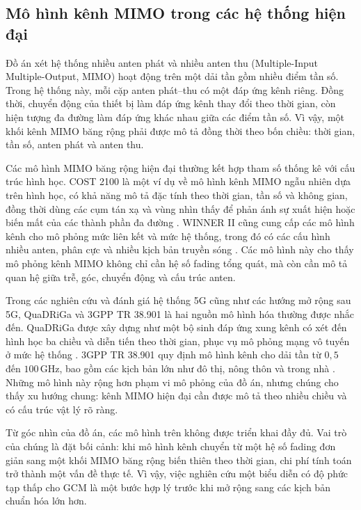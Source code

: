 \subsection{Mô hình kênh MIMO trong các hệ thống hiện đại}
\label{subsec:ch1_modern_mimo_channel_models}

Đồ án xét hệ thống nhiều anten phát và nhiều anten thu (Multiple-Input Multiple-Output, MIMO) hoạt động trên một dải tần gồm nhiều điểm tần số. Trong hệ thống này, mỗi cặp anten phát--thu có một đáp ứng kênh riêng. Đồng thời, chuyển động của thiết bị làm đáp ứng kênh thay đổi theo thời gian, còn hiện tượng đa đường làm đáp ứng khác nhau giữa các điểm tần số. Vì vậy, một khối kênh MIMO băng rộng phải được mô tả đồng thời theo bốn chiều: thời gian, tần số, anten phát và anten thu.

Các mô hình MIMO băng rộng hiện đại thường kết hợp tham số thống kê với cấu trúc hình học. COST 2100 là một ví dụ về mô hình kênh MIMO ngẫu nhiên dựa trên hình học, có khả năng mô tả đặc tính theo thời gian, tần số và không gian, đồng thời dùng các cụm tán xạ và vùng nhìn thấy để phản ánh sự xuất hiện hoặc biến mất của các thành phần đa đường \cite{Liu2012COST2100}. WINNER II cũng cung cấp các mô hình kênh cho mô phỏng mức liên kết và mức hệ thống, trong đó có các cấu hình nhiều anten, phân cực và nhiều kịch bản truyền sóng \cite{WinnerII2007}. Các mô hình này cho thấy mô phỏng kênh MIMO không chỉ cần hệ số fading tổng quát, mà còn cần mô tả quan hệ giữa trễ, góc, chuyển động và cấu trúc anten.

Trong các nghiên cứu và đánh giá hệ thống 5G cũng như các hướng mở rộng sau 5G, QuaDRiGa và 3GPP TR 38.901 là hai nguồn mô hình hóa thường được nhắc đến. QuaDRiGa được xây dựng như một bộ sinh đáp ứng xung kênh có xét đến hình học ba chiều và diễn tiến theo thời gian, phục vụ mô phỏng mạng vô tuyến ở mức hệ thống \cite{Jaeckel2014QuaDRiGa}. 3GPP TR 38.901 quy định mô hình kênh cho dải tần từ \(0{,}5\) đến \(100\,\mathrm{GHz}\), bao gồm các kịch bản lớn như đô thị, nông thôn và trong nhà \cite{3GPP38901}. Những mô hình này rộng hơn phạm vi mô phỏng của đồ án, nhưng chúng cho thấy xu hướng chung: kênh MIMO hiện đại cần được mô tả theo nhiều chiều và có cấu trúc vật lý rõ ràng.

Từ góc nhìn của đồ án, các mô hình trên không được triển khai đầy đủ. Vai trò của chúng là đặt bối cảnh: khi mô hình kênh chuyển từ một hệ số fading đơn giản sang một khối MIMO băng rộng biến thiên theo thời gian, chi phí tính toán trở thành một vấn đề thực tế. Vì vậy, việc nghiên cứu một biểu diễn có độ phức tạp thấp cho GCM là một bước hợp lý trước khi mở rộng sang các kịch bản chuẩn hóa lớn hơn.

